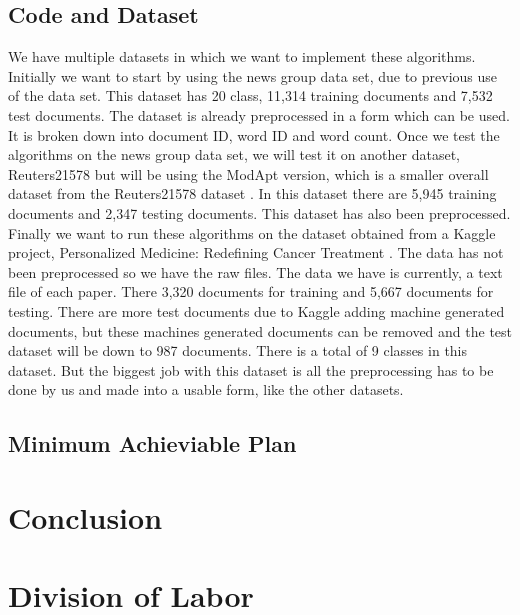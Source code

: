 \documentclass[a4paper, 11pt]{article}
\begin{document}
\subsection{Code and Dataset}
We have multiple datasets in which we want to implement these algorithms. Initially we want to start by using the news group data set, due to previous use of the data set. This dataset has 20 class, 11,314 training documents and 7,532 test documents. The dataset is already preprocessed in a form which can be used. It is broken down into document ID, word ID and word count. Once we test the algorithms on the news group data set, we will test it on another dataset, Reuters21578 but will be using the ModApt version, which is a smaller overall dataset from the Reuters21578 dataset \cite{dataset}. In this dataset there are 5,945 training documents and 2,347 testing documents. This dataset has also been preprocessed. Finally we want to run these algorithms on the dataset obtained from a Kaggle project, Personalized Medicine: Redefining Cancer Treatment \cite{kaggledataset}. The data has not been preprocessed so we have the raw files. The data we have is currently, a text file of each paper. There 3,320 documents for training and 5,667 documents for testing. There are more test documents due to Kaggle adding machine generated documents, but these machines generated documents can be removed and the test dataset will be down to 987 documents. There is a total of 9 classes in this dataset. But the biggest job with this dataset is all the preprocessing has to be done by us and made into a usable form, like the other datasets. 

\subsection{Minimum Achieviable Plan}
\section{Conclusion}
\section*{Division of Labor}
















\nocite{*}
{\small


}
\end{document}

